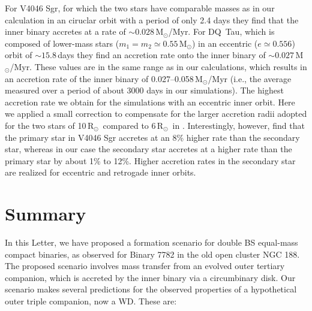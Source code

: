 \documentclass{aastex62}
\newcommand{\MSun}{\mbox{M$_\odot$}}
\newcommand{\RSun}{\mbox{R$_\odot$}}
\begin{document}
For V4046 Sgr, for which the two stars have comparable masses as in
our calculation in an ciruclar orbit with a period of only 2.4 days
they find that the inner binary accretes at a rate of $\sim
0.028$\,\MSun/Myr.  For DQ~Tau, which is composed of lower-mass stars
($m_1 = m_2 \simeq 0.55$\,\MSun) in an eccentric ($e\simeq 0.556$)
orbit of $\sim 15.8$\,days they find an accretion rate onto the inner
binary of $\sim 0.027$\,\MSun/Myr.  These values are in the same range
as in our calculations, which results in an accretion rate of the inner
binary of 0.027--0.058\,\MSun/Myr (i.e., the average measured over a period of
about 3000 days in our simulations).  The highest accretion rate we obtain for the
simulations with an eccentric inner orbit.  Here we applied a small
correction to compensate for the larger accretion radii adopted for
the two stars of 10\,\RSun\, compared to 6\,\RSun\, in
\cite{2011MNRAS.413.2679D}. Interestingly, however,
\cite{2011MNRAS.413.2679D} find that the primary star in V4046 Sgr
accretes at an 8\% higher rate than the secondary star, whereas in our
case the secondary star accretes at a higher rate than the primary
star by about 1\% to 12\%.  Higher accretion rates in the secondary
star are realized for eccentric and retrogade inner orbits.



\section{Summary} \label{sect:conclusions}

In this Letter, we have proposed a formation scenario for double BS
equal-mass compact binaries, as observed for Binary 7782 in the old
open cluster NGC 188.  The proposed scenario involves mass transfer
from an evolved outer tertiary companion, which is accreted by the
inner binary via a circumbinary disk.  Our scenario makes several
predictions for the observed properties of a hypothetical outer triple
companion, now a WD.  These are:
\end{document}
